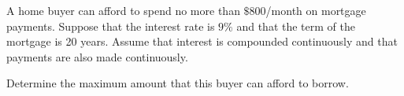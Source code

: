\documentclass[11pt]{exam}
\begin{document}
\begin{questions}
\begin{parts}

\end{parts}

\newpage

\question A home buyer can afford to spend no more than $\$800$/month on mortgage payments. Suppose that the interest rate is $9\%$ and that the term of the mortgage is 20 years. Assume that interest is compounded continuously and that payments are also made continuously.

Determine the maximum amount that this buyer can afford to borrow.

\end{questions}
\end{document}
